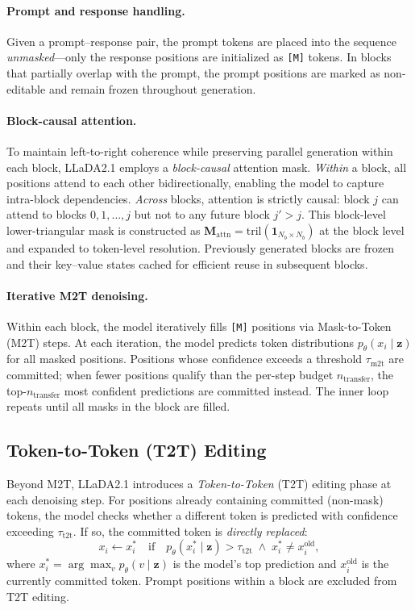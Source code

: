 \documentclass{article}
\newcommand{\mask}{\texttt{[M]}}
\newcommand{\MtoT}{\textrm{M2T}}
\newcommand{\TtoT}{\textrm{T2T}}
\newcommand{\xold}{x_i^{\mathrm{old}}}
\begin{document}
\paragraph{Prompt and response handling.} Given a prompt--response pair, the prompt tokens are placed into the sequence \emph{unmasked}---only the response positions are initialized as \mask{} tokens. In blocks that partially overlap with the prompt, the prompt positions are marked as non-editable and remain frozen throughout generation.

\paragraph{Block-causal attention.} To maintain left-to-right coherence while preserving parallel generation within each block, LLaDA2.1 employs a \emph{block-causal} attention mask. \emph{Within} a block, all positions attend to each other bidirectionally, enabling the model to capture intra-block dependencies. \emph{Across} blocks, attention is strictly causal: block $j$ can attend to blocks $0, 1, \ldots, j$ but not to any future block $j' > j$. This block-level lower-triangular mask is constructed as $\mathbf{M}_{\text{attn}} = \text{tril}(\mathbf{1}_{N_b \times N_b})$ at the block level and expanded to token-level resolution. Previously generated blocks are frozen and their key--value states cached for efficient reuse in subsequent blocks.

\paragraph{Iterative M2T denoising.} Within each block, the model iteratively fills \mask{} positions via Mask-to-Token (\MtoT{}) steps. At each iteration, the model predicts token distributions $p_\theta(x_i \mid \mathbf{z})$ for all masked positions. Positions whose confidence exceeds a threshold $\tau_{\text{m2t}}$ are committed; when fewer positions qualify than the per-step budget $n_{\text{transfer}}$, the top-$n_{\text{transfer}}$ most confident predictions are committed instead. The inner loop repeats until all masks in the block are filled.

\subsection{Token-to-Token (T2T) Editing}
\label{sec:t2t_editing}

Beyond \MtoT{}, LLaDA2.1 introduces a \emph{Token-to-Token} (\TtoT{}) editing phase at each denoising step. For positions already containing committed (non-mask) tokens, the model checks whether a different token is predicted with confidence exceeding $\tau_{\text{t2t}}$. If so, the committed token is \emph{directly replaced}:
\begin{equation}
    x_i \leftarrow x_i^{*} \quad \text{if} \quad p_\theta(x_i^{*} \mid \mathbf{z}) > \tau_{\text{t2t}} \;\land\; x_i^{*} \neq \xold,
    \label{eq:t2t}
\end{equation}
where $x_i^{*} = \arg\max_v p_\theta(v \mid \mathbf{z})$ is the model's top prediction and $\xold$ is the currently committed token. Prompt positions within a block are excluded from \TtoT{} editing.
\end{document}
